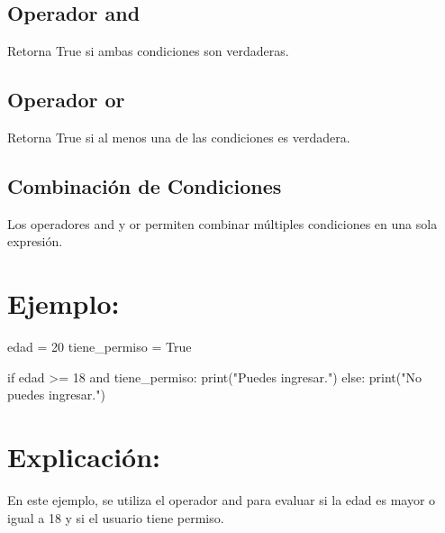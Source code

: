 \documentclass[
  a4paper,
  DIV=11,
  numbers=noendperiod,
  onepage,
  openany]{scrreprt}
\newenvironment{Shaded}{\begin{snugshade}}{\end{snugshade}}
\newcommand{\BuiltInTok}[1]{\textcolor[rgb]{0.00,0.23,0.31}{#1}}
\newcommand{\ControlFlowTok}[1]{\textcolor[rgb]{0.00,0.23,0.31}{#1}}
\newcommand{\DecValTok}[1]{\textcolor[rgb]{0.68,0.00,0.00}{#1}}
\newcommand{\KeywordTok}[1]{\textcolor[rgb]{0.00,0.23,0.31}{#1}}
\newcommand{\NormalTok}[1]{\textcolor[rgb]{0.00,0.23,0.31}{#1}}
\newcommand{\OperatorTok}[1]{\textcolor[rgb]{0.37,0.37,0.37}{#1}}
\newcommand{\StringTok}[1]{\textcolor[rgb]{0.13,0.47,0.30}{#1}}
\newcommand{\VariableTok}[1]{\textcolor[rgb]{0.07,0.07,0.07}{#1}}
\begin{document}
\hypertarget{operador-and-1}{%
\subsection{Operador and}\label{operador-and-1}}

Retorna True si ambas condiciones son verdaderas.

\hypertarget{operador-or-1}{%
\subsection{Operador or}\label{operador-or-1}}

Retorna True si al menos una de las condiciones es verdadera.

\hypertarget{combinaciuxf3n-de-condiciones-1}{%
\subsection{Combinación de
Condiciones}\label{combinaciuxf3n-de-condiciones-1}}

Los operadores and y or permiten combinar múltiples condiciones en una
sola expresión.

\hypertarget{ejemplo-35}{%
\section{Ejemplo:}\label{ejemplo-35}}

\begin{Shaded}
\begin{Highlighting}[]
\NormalTok{edad }\OperatorTok{=} \DecValTok{20}
\NormalTok{tiene\_permiso }\OperatorTok{=} \VariableTok{True}

\ControlFlowTok{if}\NormalTok{ edad }\OperatorTok{\textgreater{}=} \DecValTok{18} \KeywordTok{and}\NormalTok{ tiene\_permiso:}
    \BuiltInTok{print}\NormalTok{(}\StringTok{"Puedes ingresar."}\NormalTok{)}
\ControlFlowTok{else}\NormalTok{:}
    \BuiltInTok{print}\NormalTok{(}\StringTok{"No puedes ingresar."}\NormalTok{)}
\end{Highlighting}
\end{Shaded}

\hypertarget{explicaciuxf3n-35}{%
\section{Explicación:}\label{explicaciuxf3n-35}}

En este ejemplo, se utiliza el operador and para evaluar si la edad es
mayor o igual a 18 y si el usuario tiene permiso.
\end{document}
